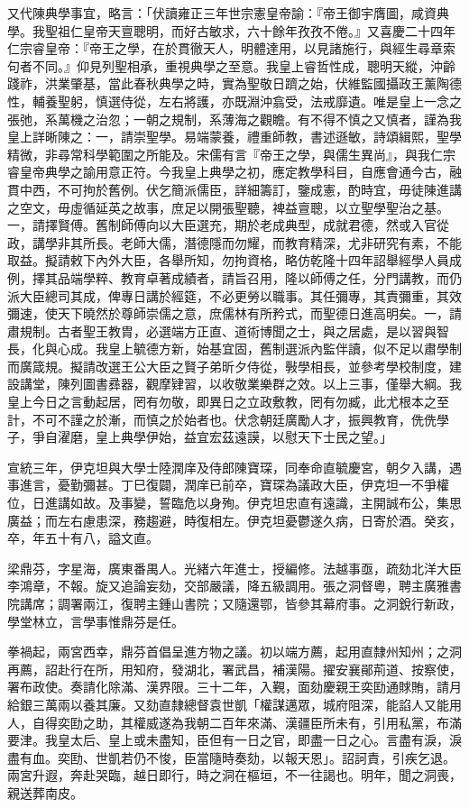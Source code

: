 \begin{pinyinscope}
又代陳典學事宜，略言：「伏讀雍正三年世宗憲皇帝諭：『帝王御宇膺圖，咸資典學。我聖祖仁皇帝天亶聰明，而好古敏求，六十餘年孜孜不倦。』又喜慶二十四年仁宗睿皇帝：『帝王之學，在於貫徹天人，明體達用，以見諸施行，與經生尋章索句者不同。』仰見列聖相承，重視典學之至意。我皇上睿哲性成，聰明天縱，沖齡踐祚，洪業肇基，當此春秋典學之時，實為聖敬日躋之始，伏維監國攝政王薰陶德性，輔養聖躬，慎選侍從，左右將護，亦既淵沖翕受，法戒靡遺。唯是皇上一念之張弛，系萬機之治忽；一朝之規制，系薄海之觀瞻。有不得不慎之又慎者，謹為我皇上詳晰陳之：一，請崇聖學。易端蒙養，禮重師教，書述遜敏，詩頌緝熙，聖學精微，非尋常科學範圍之所能及。宋儒有言『帝王之學，與儒生異尚』，與我仁宗睿皇帝典學之諭用意正符。今我皇上典學之初，應定教學科目，自應會通今古，融貫中西，不可拘於舊例。伏乞簡派儒臣，詳細籌訂，鑒成憲，酌時宜，毋徒陳進講之空文，毋虛循延英之故事，庶足以開張聖聽，裨益亶聰，以立聖學聖治之基。一，請擇賢傅。舊制師傅向以大臣選充，期於老成典型，成就君德，然或入官從政，講學非其所長。老師大儒，潛德隱而勿耀，而教育精深，尤非研究有素，不能取益。擬請敕下內外大臣，各舉所知，勿拘資格，略仿乾隆十四年詔舉經學人員成例，擇其品端學粹、教育卓著成績者，請旨召用，隆以師傅之任，分門講教，而仍派大臣總司其成，俾專日講於經筵，不必更勞以職事。其任彌專，其責彌重，其效彌速，使天下曉然於尊師崇儒之意，庶儒林有所矜式，而聖德日進高明矣。一，請肅規制。古者聖王教胄，必選端方正直、道術博聞之士，與之居處，是以習與智長，化與心成。我皇上毓德方新，始基宜固，舊制選派內監伴讀，似不足以肅學制而廣箴規。擬請改選王公大臣之賢子弟昕夕侍從，斅學相長，並參考學校制度，建設講堂，陳列圖書彞器，觀摩肄習，以收敬業樂群之效。以上三事，僅舉大綱。我皇上今日之言動起居，罔有勿敬，即異日之立政敷教，罔有勿臧，此尤根本之至計，不可不謹之於漸，而慎之於始者也。伏念朝廷廣勵人才，振興教育，侁侁學子，爭自濯磨，皇上典學伊始，益宜宏茲遠謨，以慰天下士民之望。」

宣統三年，伊克坦與大學士陸潤庠及侍郎陳寶琛，同奉命直毓慶宮，朝夕入講，遇事進言，憂勤彌甚。丁巳復闢，潤庠已前卒，寶琛為議政大臣，伊克坦一不爭權位，日進講如故。及事變，誓臨危以身殉。伊克坦忠直有遠識，主開誠布公，集思廣益；而左右慮患深，務趨避，時復相左。伊克坦憂鬱遂久病，日寄於酒。癸亥，卒，年五十有八，謚文直。

梁鼎芬，字星海，廣東番禺人。光緒六年進士，授編修。法越事亟，疏劾北洋大臣李鴻章，不報。旋又追論妄劾，交部嚴議，降五級調用。張之洞督粵，聘主廣雅書院講席；調署兩江，復聘主鍾山書院；又隨還鄂，皆參其幕府事。之洞銳行新政，學堂林立，言學事惟鼎芬是任。

拳禍起，兩宮西幸，鼎芬首倡呈進方物之議。初以端方薦，起用直隸州知州；之洞再薦，詔赴行在所，用知府，發湖北，署武昌，補漢陽。擢安襄鄖荊道、按察使，署布政使。奏請化除滿、漢界限。三十二年，入覲，面劾慶親王奕劻通賕賄，請月給銀三萬兩以養其廉。又劾直隸總督袁世凱「權謀邁眾，城府阻深，能諂人又能用人，自得奕劻之助，其權威遂為我朝二百年來滿、漢疆臣所未有，引用私黨，布滿要津。我皇太后、皇上或未盡知，臣但有一日之官，即盡一日之心。言盡有淚，淚盡有血。奕劻、世凱若仍不悛，臣當隨時奏劾，以報天恩」。詔訶責，引疾乞退。兩宮升遐，奔赴哭臨，越日即行，時之洞在樞垣，不一往謁也。明年，聞之洞喪，親送葬南皮。


\end{pinyinscope}
